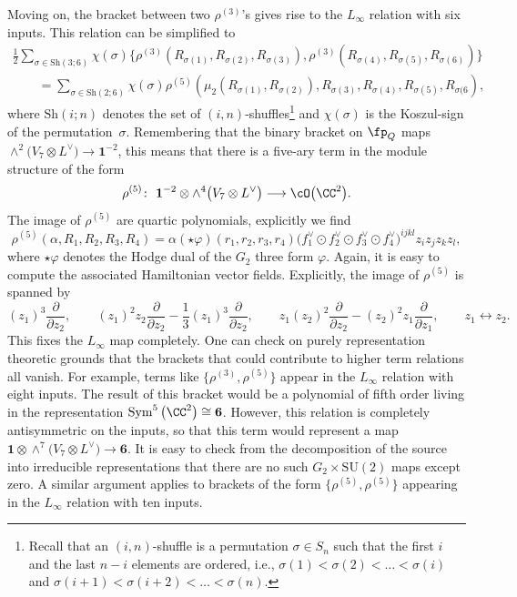 \documentclass[10pt,a4paper]{amsart}
\numberwithin{equation}{section}
\theoremstyle{definition}
\DeclareMathOperator{\Sym}{Sym}
\def\SU{\ensuremath{\mathrm{SU}}}
\begin{document}
Moving on, the bracket between two $\rho^{(3)}$'s gives rise to the $L_\infty$ relation with six inputs. This relation can be simplified to
\begin{gather*}
 \frac{1}{2} \sum_{\sigma \in \mathrm{Sh}(3;6)} \chi(\sigma) \big\{ \rho^{(3)}(R_{\sigma(1)},R_{\sigma(2)},R_{\sigma(3)}) , \rho^{(3)} (R_{\sigma(4)},R_{\sigma(5)},R_{\sigma(6)}) \big\} \\
\qquad = \sum_{\sigma \in \mathrm{Sh}(2;6)} \chi(\sigma) \rho^{(5)}( \mu_2(R_{\sigma(1)},R_{\sigma(2)}),R_{\sigma(3)},R_{\sigma(4)},R_{\sigma(5)} , R_{\sigma(6} ),
\end{gather*}
where $\mathrm{Sh}(i;n)$ denotes the set of $(i,n)$-shuffles\footnote{Recall that an $(i,n)$-shuffle is a permutation $\sigma \in S_n$ such that the first $i$ and the last $n-i$ elements are ordered, i.e., $\sigma(1) < \sigma(2) < \dots< \sigma(i)$ and $\sigma(i+1) < \sigma(i+2) < \dots < \sigma(n)$.} and $\chi(\sigma)$ is the Koszul-sign of the permutation~$\sigma$.
Remembering that the binary bracket on $\fp_Q$ maps $\wedge^2 \big(V_7 \otimes L^\vee\big) \rightarrow \textbf{1}^{-2}$, this means that there is a five-ary term in the module structure of the form
\[
 \rho^{(5)} \colon\ \textbf{1}^{-2} \otimes \wedge^4 \big(V_7 \otimes L^\vee\big) \longrightarrow \cO\big(\CC^2\big).
\]
The image of $\rho^{(5)}$ are quartic polynomials, explicitly we find
\[
 \rho^{(5)}(\alpha, R_1, R_2, R_3 , R_4) = \alpha (\star \varphi)(r_1,r_2,r_3,r_4) \big(f_1^\vee \odot f_2^\vee \odot f_3^\vee \odot f_4^\vee\big)^{ijkl} z_i z_j z_k z_l,
\]
where $\star \varphi$ denotes the Hodge dual of the $G_2$ three form $\varphi$. Again, it is easy to compute the associated Hamiltonian vector fields. Explicitly, the image of $\rho^{(5)}$ is spanned by
\[
 (z_1)^3 \frac{\partial}{\partial z_2}, \qquad (z_1)^2 z_2 \frac{\partial}{\partial z_2} - \frac{1}{3} (z_1)^3 \frac{\partial}{\partial z_2}, \qquad z_1 (z_2)^2 \frac{\partial}{\partial z_2} - (z_2)^2 z_1 \frac{\partial}{\partial z_1}, \qquad z_1 \leftrightarrow z_2.
\]
This fixes the $L_\infty$ map completely. One can check on purely representation theoretic grounds that the brackets that could contribute to higher term relations all vanish. For example, terms like $\big\{\rho^{(3)} , \rho^{(5)} \big\}$ appear in the $L_\infty$ relation with eight inputs. The result of this bracket would be a polynomial of fifth order living in the representation $\Sym^5\big(\CC^2\big) \cong \textbf{6}$. However, this relation is completely antisymmetric on the inputs, so that this term would represent a map $\textbf{1} \otimes \wedge^7 \big({V_7 \otimes L^\vee}\big) \rightarrow \textbf{6}$. It is easy to check from the decomposition of the source into irreducible representations that there are no such $G_2 \times \SU(2)$ maps except zero. A similar argument applies to brackets of the form $\big\{\rho^{(5)}, \rho^{(5)} \big\}$ appearing in the $L_\infty$ relation with ten inputs.
\end{document}
